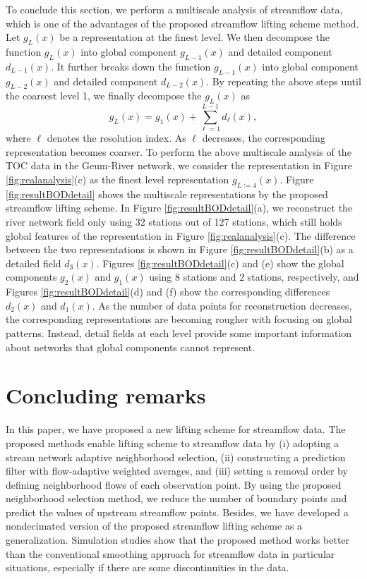\documentclass[11pt,titlepage]{article}
\begin{document}
To conclude this section, we perform a multiscale analysis of streamflow data, which is one of the advantages of the proposed streamflow lifting scheme method. Let $g_L(x)$ be a representation at the finest level. We then decompose the function $g_L(x)$ into global component $g_{L-1}(x)$ and detailed component $d_{L-1}(x)$. It further breaks down the function $g_{L-1}(x)$ into global component $g_{L-2}(x)$ and detailed component $d_{L-2}(x)$.  By repeating the above steps until the coarsest level 1, we finally decompose the $g_L(x)$ as
\[
g_L(x)=g_1(x)+\sum_{\ell=1}^{L-1}d_\ell(x), 
\]
where $\ell$ denotes the resolution index. As $\ell$ decreases, the corresponding representation becomes coarser. To perform the above multiscale analysis of the TOC data in the Geum-River network, we consider the representation in Figure \ref{fig:realanalysis}(c) as the finest level representation $g_{L:=4}(x)$. Figure \ref{fig:resultBODdetail} shows the multiscale representations by the proposed streamflow lifting scheme. In Figure \ref{fig:resultBODdetail}(a), we reconstruct the river network field only using 32 stations out of 127 stations, which still holds global features of the representation in Figure \ref{fig:realanalysis}(c). The difference between the two representations is shown in Figure \ref{fig:resultBODdetail}(b) as a detailed field $d_3(x)$. Figures \ref{fig:resultBODdetail}(c) and (e) show the global components $g_{2}(x)$ and $g_{1}(x)$ using 8 stations and 2 stations, respectively, and  Figures \ref{fig:resultBODdetail}(d) and (f) show the corresponding differences $d_{2}(x)$ and $d_{1}(x)$. As the number of data points for reconstruction decreases, the corresponding representations are becoming rougher with focusing on global patterns. Instead, detail fields at each level provide some important information about networks that global components cannot represent.

\section{Concluding remarks}\label{sec:streamflowsummary}

In this paper, we have proposed a new lifting scheme for streamflow data. The proposed methods enable lifting scheme to streamflow data by (i) adopting a stream network adaptive neighborhood selection, (ii) constructing a prediction filter with flow-adaptive weighted averages, and (iii) setting a removal order by defining neighborhood flows of each observation point. By using the proposed neighborhood selection method, we reduce the number of boundary points and predict the values of upstream streamflow points. Besides, we have developed a nondecimated version of the proposed streamflow lifting scheme as a generalization. Simulation studies show that the proposed method works better than the conventional smoothing approach for streamflow data in particular situations, especially if there are some discontinuities in the data.
\end{document}
